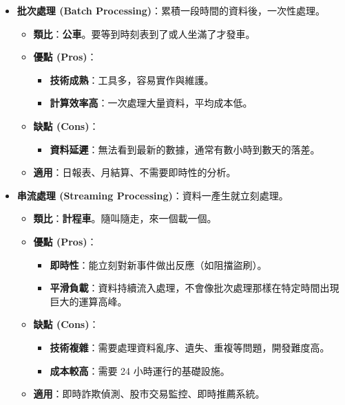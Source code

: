 \documentclass[
  letterpaper,
  DIV=11,
  numbers=noendperiod]{scrreprt}
\providecommand{\tightlist}{%
  \setlength{\itemsep}{0pt}\setlength{\parskip}{0pt}}
\begin{document}
\begin{itemize}
\tightlist
\item
  \textbf{批次處理 (Batch
  Processing)}：累積一段時間的資料後，一次性處理。

  \begin{itemize}
  \tightlist
  \item
    \textbf{類比}：\textbf{公車}。要等到時刻表到了或人坐滿了才發車。
  \item
    \textbf{優點 (Pros)}：

    \begin{itemize}
    \tightlist
    \item
      \textbf{技術成熟}：工具多，容易實作與維護。
    \item
      \textbf{計算效率高}：一次處理大量資料，平均成本低。
    \end{itemize}
  \item
    \textbf{缺點 (Cons)}：

    \begin{itemize}
    \tightlist
    \item
      \textbf{資料延遲}：無法看到最新的數據，通常有數小時到數天的落差。
    \end{itemize}
  \item
    \textbf{適用}：日報表、月結算、不需要即時性的分析。
  \end{itemize}
\item
  \textbf{串流處理 (Streaming Processing)}：資料一產生就立刻處理。

  \begin{itemize}
  \tightlist
  \item
    \textbf{類比}：\textbf{計程車}。隨叫隨走，來一個載一個。
  \item
    \textbf{優點 (Pros)}：

    \begin{itemize}
    \tightlist
    \item
      \textbf{即時性}：能立刻對新事件做出反應（如阻擋盜刷）。
    \item
      \textbf{平滑負載}：資料持續流入處理，不會像批次處理那樣在特定時間出現巨大的運算高峰。
    \end{itemize}
  \item
    \textbf{缺點 (Cons)}：

    \begin{itemize}
    \tightlist
    \item
      \textbf{技術複雜}：需要處理資料亂序、遺失、重複等問題，開發難度高。
    \item
      \textbf{成本較高}：需要 24 小時運行的基礎設施。
    \end{itemize}
  \item
    \textbf{適用}：即時詐欺偵測、股市交易監控、即時推薦系統。
  \end{itemize}
\end{itemize}
\end{document}
